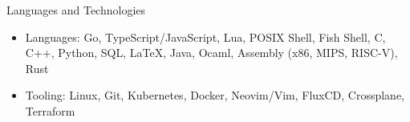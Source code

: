 \documentclass[]{resume}
\begin{document}
	\begin{cvsection}{Languages and Technologies}
		\begin{cvsubsection}{}{}{}	
			\begin{itemize}
				\item Languages: Go, TypeScript/JavaScript, Lua, POSIX Shell, Fish Shell, C, C++, Python, SQL, LaTeX, Java, Ocaml, Assembly (x86, MIPS, RISC-V), Rust
				\item Tooling: Linux, Git, Kubernetes, Docker, Neovim/Vim, FluxCD, Crossplane, Terraform
			\end{itemize}
		\end{cvsubsection}
	\end{cvsection}
	
\end{document}
